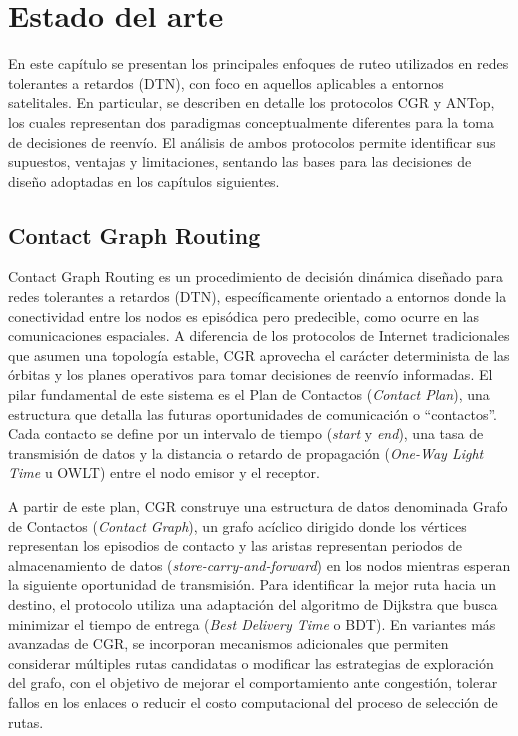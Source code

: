 \chapter{Estado del arte}

En este capítulo se presentan los principales enfoques de ruteo utilizados en redes tolerantes a retardos (DTN), con foco en aquellos aplicables a entornos satelitales. En particular, se describen en detalle los protocolos CGR y ANTop, los cuales representan dos paradigmas conceptualmente diferentes para la toma de decisiones de reenvío. El análisis de ambos protocolos permite identificar sus supuestos, ventajas y limitaciones, sentando las bases para las decisiones de diseño adoptadas en los capítulos siguientes.

\section{Contact Graph Routing}
Contact Graph Routing \cite{burleigh-dtnrg-cgr-01} \cite{fraire2021routing} es un procedimiento de decisión dinámica diseñado para redes tolerantes a retardos (DTN), específicamente orientado a entornos donde la conectividad entre los nodos es episódica pero predecible, como ocurre en las comunicaciones espaciales. A diferencia de los protocolos de Internet tradicionales que asumen una topología estable, CGR aprovecha el carácter determinista de las órbitas y los planes operativos para tomar decisiones de reenvío informadas. El pilar fundamental de este sistema es el Plan de Contactos (\textit{Contact Plan}), una estructura que detalla las futuras oportunidades de comunicación o ``contactos''. Cada contacto se define por un intervalo de tiempo (\textit{start} y \textit{end}), una tasa de transmisión de datos y la distancia o retardo de propagación (\textit{One-Way Light Time} u OWLT) entre el nodo emisor y el receptor.

A partir de este plan, CGR construye una estructura de datos denominada Grafo de Contactos (\textit{Contact Graph}), un grafo acíclico dirigido donde los vértices representan los episodios de contacto y las aristas representan periodos de almacenamiento de datos (\textit{store-carry-and-forward}) en los nodos mientras esperan la siguiente oportunidad de transmisión. Para identificar la mejor ruta hacia un destino, el protocolo utiliza una adaptación del algoritmo de Dijkstra que busca minimizar el tiempo de entrega (\textit{Best Delivery Time} o BDT). En variantes más avanzadas de CGR, se incorporan mecanismos adicionales que permiten considerar múltiples rutas candidatas o modificar las estrategias de exploración del grafo, con el objetivo de mejorar el comportamiento ante congestión, tolerar fallos en los enlaces o reducir el costo computacional del proceso de selección de rutas. \cite{FRAIRE201831}

